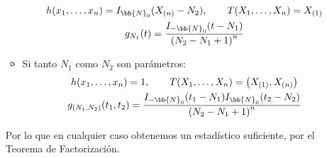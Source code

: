 \begin{ejercicio}
\begin{enumerate}[label=\alph*)]
\begin{itemize}
                    \begin{gather*}
                        h(x_1, \ldots, x_n) = I_{\bb{N}_0}(X_{(n)}-N_2), \qquad T(X_1, \ldots, X_n) = X_{(1)} \\
                        g_{N_1}(t) = \dfrac{I_{-\bb{N}_0}(t-N_1)}{{(N_2-N_1+1)}^{n}}
                    \end{gather*}
                \item Si tanto $N_1$ como $N_2$ son parámetros:
                    \begin{gather*}
                        h(x_1,\ldots,x_n) = 1, \qquad T(X_1, \ldots, X_n) = \left(X_{(1)}, X_{(n)}\right) \\
                        g_{(N_1,N_2)}(t_1,t_2) = \dfrac{I_{-\bb{N}_0}(t_1-N_1)I_{\bb{N}_0}(t_2-N_2)}{{(N_2-N_1+1)}^{n}}
                    \end{gather*}
            \end{itemize}
            Por lo que en cualquier caso obtenemos un estadístico suficiente, por el Teorema de Factorización.
    \end{enumerate}
\end{ejercicio}

